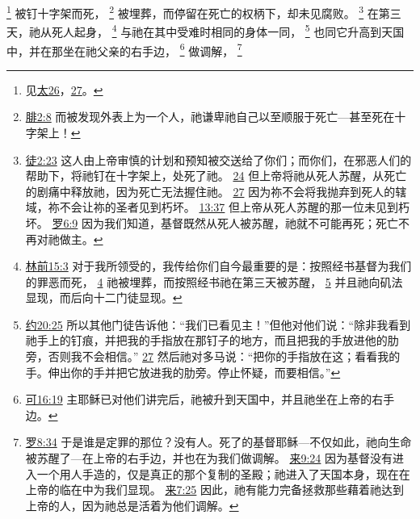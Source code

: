 \documentclass[12pt, a4paper, oneside]{ctexart}
\begin{document}
	\footnote {
		见\href{https://biblehub.com/niv/matthew/26.htm}{太26}，\href{https://biblehub.com/niv/matthew/26.htm}{27}。
	}
	被钉十字架而死，
	\footnote {
		\href{https://biblehub.com/philippians/2-8.htm}{腓2:8} 而被发现外表上为一个人，祂谦卑祂自己以至顺服于死亡---甚至死在十字架上！
	}
	被埋葬，而停留在死亡的权柄下，却未见腐败。
	\footnote {
		\href{https://biblehub.com/acts/2-23.htm}{徒2:23} 这人由上帝审慎的计划和预知被交送给了你们；而你们，在邪恶人们的帮助下，将祂钉在十字架上，处死了祂。
		\href{https://biblehub.com/acts/2-24.htm}{24} 但上帝将祂从死人苏醒，从死亡的剧痛中释放祂，因为死亡无法握住祂。
		\href{https://biblehub.com/acts/2-27.htm}{27} 因为祢不会将我抛弃到死人的辖域，祢不会让祢的圣者见到朽坏。
		\href{https://biblehub.com/acts/13-37.htm}{13:37} 但上帝从死人苏醒的那一位未见到朽坏。
		\href{https://biblehub.com/romans/6-9.htm}{罗6:9} 因为我们知道，基督既然从死人被苏醒，祂就不可能再死；死亡不再对祂做主。
	}
	在第三天，祂从死人起身，
	\footnote {
		\href{https://biblehub.com/1_corinthians/15-3.htm}{林前15:3} 对于我所领受的，我传给你们自今最重要的是：按照经书基督为我们的罪恶而死，
		\href{https://biblehub.com/1_corinthians/15-4.htm}{4} 祂被埋葬，而按照经书祂在第三天被苏醒，
		\href{https://biblehub.com/1_corinthians/15-5.htm}{5} 并且祂向矶法显现，而后向十二门徒显现。
	}
	与祂在其中受难时相同的身体一同，
	\footnote {
		\href{https://biblehub.com/john/20-25.htm}{约20:25} 所以其他门徒告诉他：“我们已看见主！”但他对他们说：“除非我看到祂手上的钉痕，并把我的手指放在那钉子的地方，而且把我的手放进他的肋旁，否则我不会相信。”
		\href{https://biblehub.com/john/20-27.htm}{27} 然后祂对多马说：“把你的手指放在这；看看我的手。伸出你的手并把它放进我的肋旁。停止怀疑，而要相信。”
	}
	也同它升高到天国中，并在那坐在祂父亲的右手边，
	\footnote {
		\href{https://biblehub.com/mark/16-19.htm}{可16:19} 主耶稣已对他们讲完后，祂被升到天国中，并且祂坐在上帝的右手边。
	}
	做调解，
	\footnote {
		\href{https://biblehub.com/romans/8-34.htm}{罗8:34} 于是谁是定罪的那位？没有人。死了的基督耶稣---不仅如此，祂向生命被苏醒了---在上帝的右手边，并也在为我们做调解。
		\href{https://biblehub.com/hebrews/9-24.htm}{来9:24} 因为基督没有进入一个用人手造的，仅是真正的那个复制的圣殿；祂进入了天国本身，现在在上帝的临在中为我们显现。
		\href{https://biblehub.com/hebrews/7-25.htm}{来7:25} 因此，祂有能力完备拯救那些藉着祂达到上帝的人，因为祂总是活着为他们调解。
	}
\end{document}
